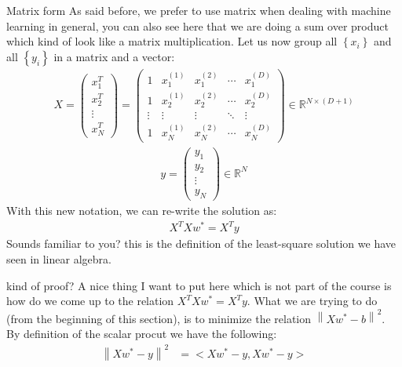	\begin{parag}{Matrix form}
	    As said before, we prefer to use matrix when dealing with machine learning in general, you can also see here that we are doing a sum over product which kind of look like a matrix multiplication. Let us now group all $\left\{x_i\right\}$ and all $\left\{y_i\right\}$ in a matrix and a vector:
		\begin{align*} 
			X = \begin{pmatrix} x_1^{T} \\ x_2^{T} \\ \vdots \\ x_N^{T} \end{pmatrix} = \begin{pmatrix} 1 & x_1^{\left(1\right)} & x_1^{\left(2\right)} & \cdots & x_1^{\left(D\right)} \\  1& x_2^{\left(1\right)} &x_2^{\left(2\right)}  & \cdots  &  x_2^{\left(D\right)}\\ \vdots  & \vdots  &  \vdots & \ddots  & \vdots  \\ 1 & x_N^{\left(1\right)} &  x_N^{\left(2\right)}& \cdots & x_N^{\left(D\right)}  \end{pmatrix} \in \mathbb{R}^{N \times \left(D + 1\right)}
		\end{align*}
		\begin{align*} 
			y =  \begin{pmatrix} y_1 \\ y_2 \\ \vdots \\ y_N \end{pmatrix} \in \mathbb{R}^{N}
		\end{align*}
		With this new notation, we can re-write the solution as:
		\begin{align*} 
			X^{T}Xw^{\ast} = X^{T}y
		\end{align*}
		Sounds familiar to you? this is the definition of the least-square solution we have seen in linear algebra.
		\begin{subparag}{kind of proof?}
		    A nice thing I want to put here which is not part of the course is how do we come up to the relation $X^{T}Xw^{\ast} =  X^Ty$. What we are trying to do (from the beginning of this section), is to minimize the relation $\left\|Xw^{\ast} - b\right\|^2$. By definition of the scalar procut we have the following:
			\begin{align*} 
				\left\|Xw^{\ast} - y\right\|^2 &=  <Xw^{\ast} - y, Xw^{\ast} - y>\\

\end{align*}
\end{subparag}
\end{parag}

